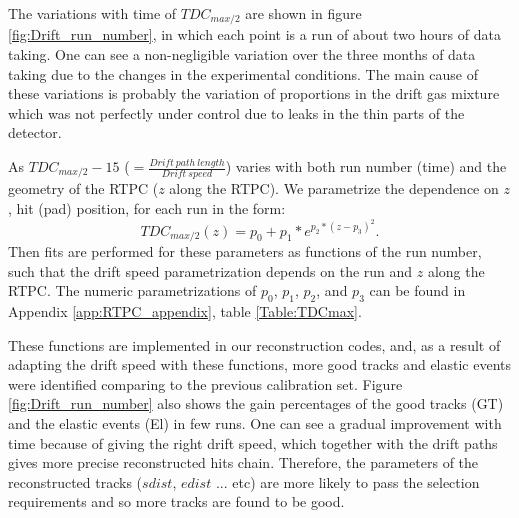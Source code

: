 The variations with time of $TDC_{max/2}$ are shown in figure 
\ref{fig:Drift_run_number}, in which each point is a run of about two hours of 
data taking. One can see a non-negligible variation over the three months of 
data taking due to the changes in the experimental conditions. The main cause 
of these variations is probably the variation of proportions in the drift gas 
mixture which was not perfectly under control due to leaks in the thin parts of 
the detector.

As $TDC_{max/2} -15 $ ($= \frac{Drift~path~length}{Drift~speed}$) varies with 
both run number (time) and the geometry of the RTPC ($z$ along the RTPC). We
parametrize the dependence on $z$, hit (pad) position, for each run in the 
form:
\begin{equation}
TDC_{max/2} (z)= p_{0} +  p_{1} * e^{p_{2}*(z-p_{3})^{2}}.
\label{equ:drift_speed_fit}
\end{equation}
Then fits are performed for these parameters as functions of the run number, 
such that the drift speed parametrization depends on the run and $z$ along the 
RTPC. The numeric parametrizations of $p_{0}$, $p_{1}$, $p_{2}$, and $p_{3}$ 
can be found in Appendix \ref{app:RTPC_appendix}, table \ref{Table:TDCmax}. 

These functions are implemented in our reconstruction codes, and, as a result 
of adapting the drift speed with these functions, more good tracks and elastic 
events were identified comparing to the previous calibration set. Figure 
\ref{fig:Drift_run_number} also shows the gain percentages of the good tracks 
(GT) and the elastic events (El) in few runs. One can see a gradual improvement 
with time because of giving the right drift speed, which together with the 
drift paths gives more precise reconstructed hits chain. Therefore, the 
parameters of the reconstructed tracks ($sdist$, $edist$ ... etc) are more likely to pass the 
selection requirements and so more tracks are found to be good. 


